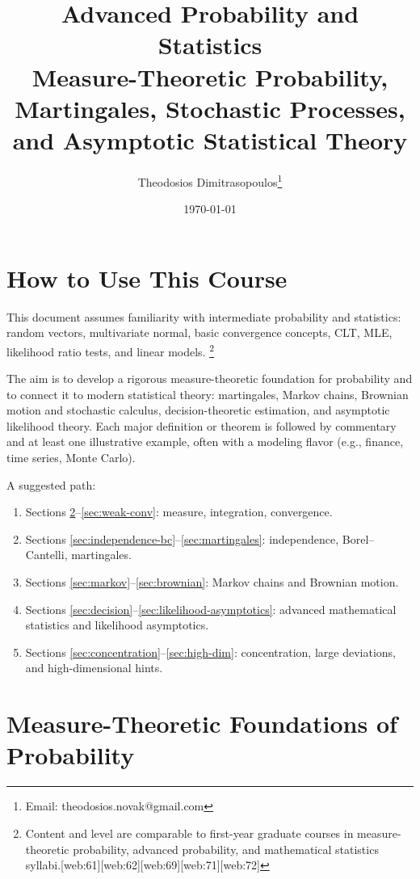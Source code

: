 \documentclass[11pt,a4paper]{article}
\title{Advanced Probability and Statistics\\[0.5em]
       \large Measure-Theoretic Probability, Martingales, Stochastic Processes,\\
       and Asymptotic Statistical Theory}
\author{Theodosios Dimitrasopoulos\footnote{Email: theodosios.novak@gmail.com}}
\date{\today}
\numberwithin{equation}{section}
\begin{document}
\maketitle
\tableofcontents
\newpage

\section{How to Use This Course}

This document assumes familiarity with intermediate probability and statistics: random vectors, multivariate normal, basic convergence concepts, CLT, MLE, likelihood ratio tests, and linear models.%
\footnote{Content and level are comparable to first-year graduate courses in measure-theoretic probability, advanced probability, and mathematical statistics syllabi.[web:61][web:62][web:69][web:71][web:72]}

The aim is to develop a rigorous measure-theoretic foundation for probability and to connect it to modern statistical theory: martingales, Markov chains, Brownian motion and stochastic calculus, decision-theoretic estimation, and asymptotic likelihood theory. 
Each major definition or theorem is followed by commentary and at least one illustrative example, often with a modeling flavor (e.g., finance, time series, Monte Carlo).

A suggested path:
\begin{enumerate}
    \item Sections \ref{sec:measure-foundations}--\ref{sec:weak-conv}: measure, integration, convergence.
    \item Sections \ref{sec:independence-bc}--\ref{sec:martingales}: independence, Borel--Cantelli, martingales.
    \item Sections \ref{sec:markov}--\ref{sec:brownian}: Markov chains and Brownian motion.
    \item Sections \ref{sec:decision}--\ref{sec:likelihood-asymptotics}: advanced mathematical statistics and likelihood asymptotics.
    \item Sections \ref{sec:concentration}--\ref{sec:high-dim}: concentration, large deviations, and high-dimensional hints.
\end{enumerate}

\newpage

\section{Measure-Theoretic Foundations of Probability}
\label{sec:measure-foundations}
\end{document}
